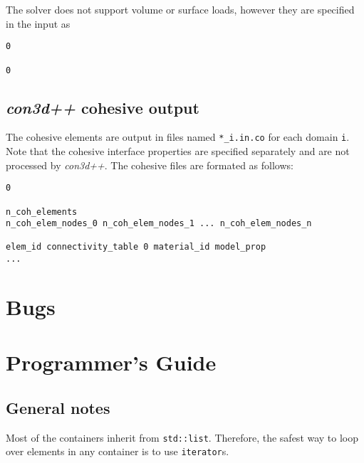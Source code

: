 \documentclass[]{article}
\def\con{\emph{con3d++}}
\def\gap{\vspace*{5mm}}
\begin{document}
\gap
{}
The solver does not support volume or surface loads, however they are
specified in the input as
\begin{center}
  \begin{minipage}{0.9\textwidth}
\begin{lstlisting}
0

0
\end{lstlisting}
  \end{minipage}
\end{center}

\subsection{\con{} cohesive output}\label{sec:format:coh}
The cohesive elements are output in files named \verb=*_i.in.co= for
each domain \verb=i=. Note that the cohesive interface properties are
specified separately and are not processed by \con{}. The cohesive
files are formated as follows:
\begin{center}
  \begin{minipage}{0.9\textwidth}
\begin{lstlisting}
0

n_coh_elements
n_coh_elem_nodes_0 n_coh_elem_nodes_1 ... n_coh_elem_nodes_n

elem_id connectivity_table 0 material_id model_prop
...
\end{lstlisting}
  \end{minipage}
\end{center}

\section{Bugs}

\section{Programmer's Guide}
\subsection{General notes}
Most of the containers inherit from \verb=std::list=. Therefore, the
safest way to loop over elements in any container is to use
\verb=iterator=s.
\end{document}
